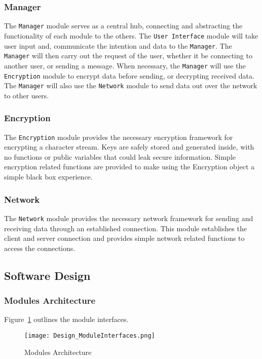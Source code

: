\documentclass[sigconf]{acmart}
\begin{document}
\subsubsection{Manager}
The \texttt{Manager} module serves as a central hub, connecting and abstracting the functionality
of each module to the others. The \texttt{User Interface} module will take user input and,
communicate the intention and data to the \texttt{Manager}. The \texttt{Manager} will then carry
out the request of the user, whether it be connecting to another user, or sending a message. When
necessary, the \texttt{Manager} will use the \texttt{Encryption} module to encrypt data before
sending, or decrypting received data. The \texttt{Manager} will also use the \texttt{Network}
module to send data out over the network to other users.

\subsubsection{Encryption}
The \texttt{Encryption} module provides the necessary encryption framework for encrypting a
character stream. Keys are safely stored and generated inside, with no functions or public
variables that could leak secure information. Simple encryption related functions are provided to
make using the Encryption object a simple black box experience.

\subsubsection{Network}
The \texttt{Network} module provides the necessary network framework for sending and receiving
data through an established connection. This module establishes the client and server
connection and provides simple network related functions to access the connections.

\subsection{Software Design}

\subsubsection{Modules Architecture}
Figure~\ref{Modules Architecture} outlines the module interfaces.
\begin{figure}[htb]
	\begin{center}
		\texttt{[image: Design\_ModuleInterfaces.png]}
		\caption{Modules Architecture}
		\label{Modules Architecture}
	\end{center}
\end{figure}
\end{document}
